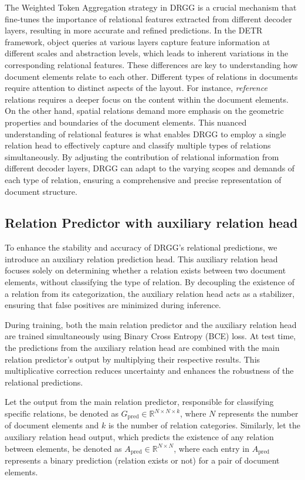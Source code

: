 The Weighted Token Aggregation strategy in DRGG is a crucial mechanism that fine-tunes the importance of relational features extracted from different decoder layers, resulting in more accurate and refined predictions. In the DETR framework, object queries at various layers capture feature information at different scales and abstraction levels, which leads to inherent variations in the corresponding relational features. These differences are key to understanding how document elements relate to each other. Different types of relations in documents require attention to distinct aspects of the layout. For instance, \textit{reference} relations requires a deeper focus on the content within the document elements. On the other hand, spatial relations demand more emphasis on the geometric properties and boundaries of the document elements. This nuanced understanding of relational features is what enables DRGG to employ a single relation head to effectively capture and classify multiple types of relations simultaneously. By adjusting the contribution of relational information from different decoder layers, DRGG can adapt to the varying scopes and demands of each type of relation, ensuring a comprehensive and precise representation of document structure.

\subsection{Relation Predictor with auxiliary relation head}

To enhance the stability and accuracy of DRGG's relational predictions, we introduce an auxiliary relation prediction head. This auxiliary relation head focuses solely on determining whether a relation exists between two document elements, without classifying the type of relation. By decoupling the existence of a relation from its categorization, the auxiliary relation head acts as a stabilizer, ensuring that false positives are minimized during inference.

During training, both the main relation predictor and the auxiliary relation head are trained simultaneously using Binary Cross Entropy (BCE) loss. At test time, the predictions from the auxiliary relation head are combined with the main relation predictor's output by multiplying their respective results. This multiplicative correction reduces uncertainty and enhances the robustness of the relational predictions.

Let the output from the main relation predictor, responsible for classifying specific relations, be denoted as $ G_{\text{pred}} \in \mathbb{R}^{N \times N \times k} $, where $ N $ represents the number of document elements and $ k $ is the number of relation categories. Similarly, let the auxiliary relation head output, which predicts the existence of any relation between elements, be denoted as $ A_{\text{pred}} \in \mathbb{R}^{N \times N} $, where each entry in $ A_{\text{pred}} $ represents a binary prediction (relation exists or not) for a pair of document elements.

